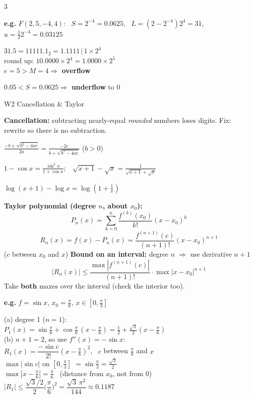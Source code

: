 \documentclass[8pt,a4paper]{extarticle}
\newcommand{\hd}[1]{\par\vspace{3pt}\noindent\colorbox{accent}{\parbox{\dimexpr\linewidth-2\fboxsep}{\color{white}\bfseries\strut #1}}\par\vspace{1pt}}
\newcommand{\sub}[1]{\textbf{\color{accent}#1}}
\newenvironment{ex}[1]{\par\vspace{2pt}\noindent\begin{lrbox}{\exbox}\begin{minipage}{\dimexpr\linewidth-2\fboxsep}\RaggedRight\color{grn}\textbf{e.g.} #1\par\setlength{\parskip}{1.5pt}}{\end{minipage}\end{lrbox}\colorbox{exbg}{\usebox{\exbox}}\par\vspace{1pt}}
\begin{document}
\begin{multicols*}{3}
\begin{ex}{$F(2,5,-4,4)$: \ $S=2^{-4}=0.0625$, \ $L=(2-2^{-4})2^4=31$, \ $u=\frac12 2^{-4}=0.03125$}
$31.5=11111.1_2=1.1111\,|\,1\times2^4$\\
round up: $10.0000\times2^4=1.0000\times2^5$\\
$e=5>M=4\Rightarrow$ \textbf{overflow}

$0.05<S=0.0625\Rightarrow$ \textbf{underflow} to 0
\end{ex}

\hd{W2 Cancellation \& Taylor}
\sub{Cancellation:} subtracting nearly-equal \emph{rounded} numbers loses digits. Fix: rewrite so there is no subtraction.
\begin{tl}
\item $\frac{-b+\sqrt{b^2-4ac}}{2a}=\frac{-2c}{b+\sqrt{b^2-4ac}}$ ($b>0$)
\item $1-\cos x=\frac{\sin^2x}{1+\cos x}$;\ \ $\sqrt{x+1}-\sqrt x=\frac{1}{\sqrt{x+1}+\sqrt x}$
\item $\log(x+1)-\log x=\log(1+\frac1x)$
\end{tl}
\sub{Taylor polynomial (degree $n$, about $x_0$):}
\[P_n(x)=\sum_{k=0}^n\frac{f^{(k)}(x_0)}{k!}(x-x_0)^k\]
\[R_n(x)=f(x)-P_n(x)=\frac{f^{(n+1)}(c)}{(n+1)!}(x-x_0)^{n+1}\]
($c$ between $x_0$ and $x$)\quad
\sub{Bound on an interval:} degree $n$ $\Rightarrow$ use derivative $n+1$
\[|R_n(x)|\le\frac{\max|f^{(n+1)}(c)|}{(n+1)!}\cdot\max|x-x_0|^{n+1}\]
Take \textbf{both} maxes over the interval (check the interior too).
\begin{ex}{$f=\sin x$, $x_0=\frac\pi6$, $x\in[0,\frac\pi3]$}
(a) degree 1 ($n=1$):\\
$P_1(x)=\sin\frac\pi6+\cos\frac\pi6\,(x-\frac\pi6)=\frac12+\frac{\sqrt3}2(x-\frac\pi6)$\\
(b) $n+1=2$, so use $f''(x)=-\sin x$:\\
$R_1(x)=\dfrac{-\sin c}{2!}(x-\frac\pi6)^2$, \ $c$ between $\frac\pi6$ and $x$\\
$\max|\sin c|$ on $[0,\frac\pi3]$ $=\sin\frac\pi3=\frac{\sqrt3}2$\\
$\max|x-\frac\pi6|=\frac\pi6$ \ (distance from $x_0$, not from 0)\\
$|R_1|\le\dfrac{\sqrt3/2}{2}\Big(\dfrac\pi6\Big)^2=\dfrac{\sqrt3\,\pi^2}{144}\approx0.1187$
\end{ex}


\end{multicols*}
\end{document}
